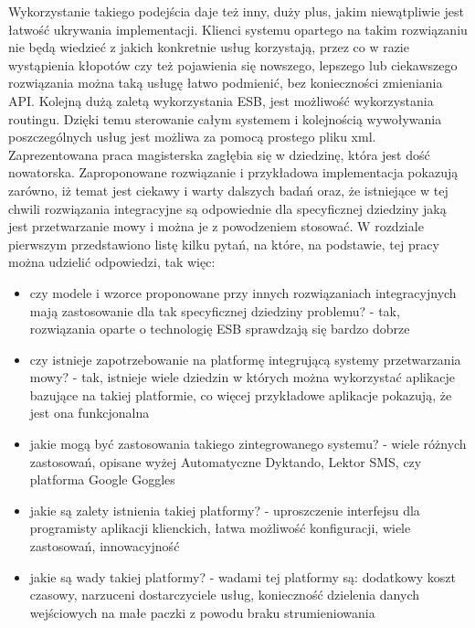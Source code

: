 Wykorzystanie takiego podejścia daje też inny, duży plus, jakim niewątpliwie jest łatwość ukrywania implementacji. Klienci systemu opartego na takim rozwiązaniu nie będą wiedzieć z jakich konkretnie usług korzystają, przez co w razie wystąpienia kłopotów czy też pojawienia się nowszego, lepszego lub ciekawszego rozwiązania można taką usługę łatwo podmienić, bez konieczności zmieniania API. Kolejną dużą zaletą wykorzystania ESB, jest możliwość wykorzystania routingu. Dzięki temu sterowanie całym systemem i kolejnością wywoływania poszczególnych usług jest możliwa za pomocą prostego pliku xml.  \\
Zaprezentowana praca magisterska zagłębia się w dziedzinę, która jest dość nowatorska. Zaproponowane rozwiązanie i przykładowa implementacja pokazują zarówno, iż temat jest ciekawy i warty dalszych badań oraz, że istniejące w tej chwili rozwiązania integracyjne są odpowiednie dla specyficznej dziedziny jaką jest przetwarzanie mowy i można je z powodzeniem stosować. W rozdziale pierwszym przedstawiono listę kilku pytań, na które, na podstawie, tej pracy można udzielić odpowiedzi, tak więc:
\begin{itemize}
	\item czy modele i wzorce proponowane przy innych rozwiązaniach integracyjnych mają zastosowanie dla tak specyficznej dziedziny problemu? - tak, rozwiązania oparte o technologię ESB sprawdzają się bardzo dobrze
	\item czy istnieje zapotrzebowanie na platformę integrującą systemy przetwarzania mowy? - tak, istnieje wiele dziedzin w których można wykorzystać aplikacje bazujące na takiej platformie, co więcej przykładowe aplikacje pokazują, że jest ona funkcjonalna
	\item jakie mogą być zastosowania takiego zintegrowanego systemu? - wiele różnych zastosowań, opisane wyżej Automatyczne Dyktando, Lektor SMS, czy platforma Google Goggles 
	\item jakie są zalety istnienia takiej platformy? - uproszczenie interfejsu dla programisty aplikacji klienckich, łatwa możliwość konfiguracji, wiele zastosowań, innowacyjność
	\item jakie są wady takiej platformy? - wadami tej platformy są: dodatkowy koszt czasowy, narzuceni dostarczyciele usług, konieczność dzielenia danych wejściowych na małe paczki z powodu braku strumieniowania
\end{itemize}







